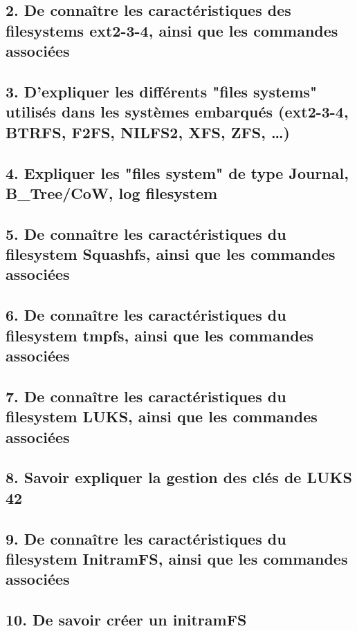 \documentclass[resume]{subfiles}
\begin{document}
\subsection{2. De connaître les caractéristiques des filesystems ext2-3-4, ainsi que les commandes associées}


\subsection{3. D’expliquer les différents "files systems" utilisés dans les systèmes embarqués (ext2-3-4, BTRFS, F2FS, NILFS2, XFS, ZFS, …)}


\subsection{4. Expliquer les "files system" de type Journal, B\_Tree/CoW, log filesystem}


\subsection{5. De connaître les caractéristiques du filesystem Squashfs, ainsi que les commandes associées}


\subsection{6. De connaître les caractéristiques du filesystem tmpfs, ainsi que les commandes associées}


\subsection{7. De connaître les caractéristiques du filesystem LUKS, ainsi que les commandes associées}


\subsection{8. Savoir expliquer la gestion des clés de LUKS 42}


\subsection{9. De connaître les caractéristiques du filesystem InitramFS, ainsi que les commandes associées}


\subsection{10. De savoir créer un initramFS}
\end{document}
